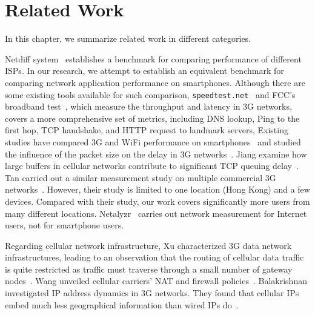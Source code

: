 \chapter{Related Work}
\label{chap:related}

In this chapter, we summarize related work in different categories.


Netdiff system~\cite{Mahajan:NSDI2008:NetDiff} establishes a benchmark for comparing performance of different ISPs. In our research, we attempt to establish an equivalent benchmark for comparing network application performance on smartphones. Although there are some existing tools available for such comparison, \eg \texttt{speedtest.net}~\cite{speedtestnet} and FCC's broadband test~\cite{fccspeedtest}, which measure the throughput and latency in 3G networks, \mobiperf covers a more comprehensive set of metrics, including DNS lookup, Ping to the first hop, TCP handshake, and HTTP request to landmark servers, \etc Existing studies have compared 3G and WiFi performance on smartphones~\cite{Gass:3GWiFi:PAM2010} and studied the influence of the packet size on the delay in 3G networks~\cite{Arlos:OneWay:PAM2010}. Jiang \etal examine how large buffers in cellular networks contribute to significant TCP queuing delay~\cite{jiang12}. Tan \etal carried out a similar measurement study on multiple commercial 3G networks~\cite{wltan07}. However, their study is limited to one location (Hong Kong) and a few devices. Compared with their study, our work covers significantly more users from many different locations. Netalyzr~\cite{netalyzr} carries out network measurement for Internet users, not for smartphone users.

Regarding cellular network infrastructure, Xu \etal characterized 3G data network infrastructures, leading to an observation that the routing of cellular data traffic is quite restricted as traffic must traverse through a small number of gateway nodes~\cite{sigmetrics.cluster}. Wang \etal unveiled cellular carriers' NAT and firewall policies~\cite{sigcomm.nat}. Balakrishnan \etal investigated IP address dynamics in 3G networks. They found that cellular IPs embed much less geographical information than wired IPs do~\cite{Mahesh:Ephemera:IMC09}. 

